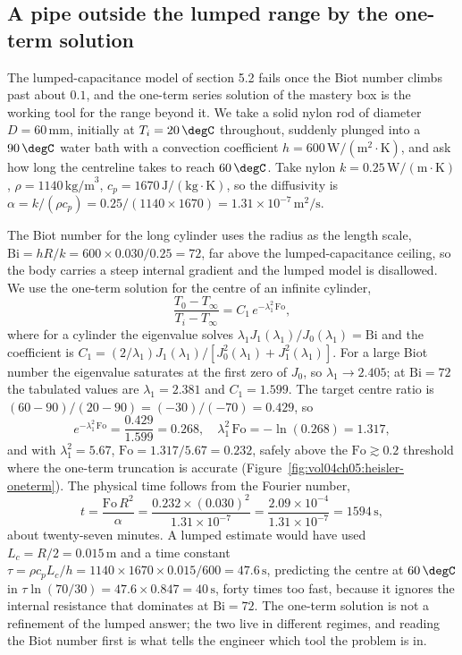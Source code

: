 \subsection{A pipe outside the lumped range by the one-term solution}

The lumped-capacitance model of section 5.2 fails once the Biot number
climbs past about $0.1$, and the one-term series solution of the mastery
box is the working tool for the range beyond it. We take a solid nylon rod
of diameter $D = 60\,\si{\milli\meter}$, initially at $T_i = 20\,\degC$
throughout, suddenly plunged into a $90\,\degC$ water bath with a
convection coefficient $h = 600\,\text{W}/(\text{m}^2\cdot\si{\kelvin})$,
and ask how long the centreline takes to reach $60\,\degC$. Take nylon
$k = 0.25\,\text{W}/(\text{m}\cdot\si{\kelvin})$, $\rho = 1140\,\text{kg/m}
^3$, $c_p = 1670\,\text{J}/(\text{kg}\cdot\si{\kelvin})$, so the diffusivity
is $\alpha = k/(\rho c_p) = 0.25/(1140\times1670) = 1.31\times10^{-7}\,
\text{m}^2/\text{s}$.

The Biot number for the long cylinder uses the radius as the length scale,
$\text{Bi} = h R/k = 600\times0.030/0.25 = 72$, far above the
lumped-capacitance ceiling, so the body carries a steep internal gradient
and the lumped model is disallowed. We use the one-term solution for the
centre of an infinite cylinder,
\[
\frac{T_0 - T_\infty}{T_i - T_\infty} = C_1\,e^{-\lambda_1^2\,\text{Fo}},
\]
where for a cylinder the eigenvalue solves $\lambda_1 J_1(\lambda_1)/
J_0(\lambda_1) = \text{Bi}$ and the coefficient is $C_1 = (2/\lambda_1)
J_1(\lambda_1)/[J_0^2(\lambda_1) + J_1^2(\lambda_1)]$. For a large Biot
number the eigenvalue saturates at the first zero of $J_0$, so
$\lambda_1 \to 2.405$; at $\text{Bi} = 72$ the tabulated values are
$\lambda_1 = 2.381$ and $C_1 = 1.599$. The target centre ratio is
$(60 - 90)/(20 - 90) = (-30)/(-70) = 0.429$, so
\[
e^{-\lambda_1^2\,\text{Fo}} = \frac{0.429}{1.599} = 0.268, \quad
\lambda_1^2\,\text{Fo} = -\ln(0.268) = 1.317,
\]
and with $\lambda_1^2 = 5.67$, $\text{Fo} = 1.317/5.67 = 0.232$, safely
above the $\text{Fo} \gtrsim 0.2$ threshold where the one-term truncation
is accurate (Figure~\ref{fig:vol04ch05:heisler-oneterm}). The physical
time follows from the Fourier number,
\[
t = \frac{\text{Fo}\,R^2}{\alpha} = \frac{0.232\times(0.030)^2}{1.31\times
10^{-7}} = \frac{2.09\times10^{-4}}{1.31\times10^{-7}} = 1594\,\text{s},
\]
about twenty-seven minutes. A lumped estimate would have used $L_c = R/2 =
0.015\,\text{m}$ and a time constant $\tau = \rho c_p L_c/h = 1140\times
1670\times0.015/600 = 47.6\,\text{s}$, predicting the centre at
$60\,\degC$ in $\tau\ln(70/30) = 47.6\times0.847 = 40\,\text{s}$, forty
times too fast, because it ignores the internal resistance that dominates
at $\text{Bi} = 72$. The one-term solution is not a refinement of the
lumped answer; the two live in different regimes, and reading the Biot
number first is what tells the engineer which tool the problem is in.


